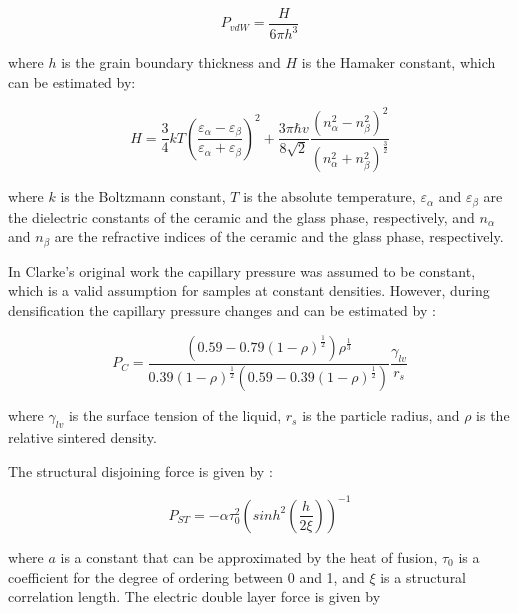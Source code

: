 \begin{equation}
\label{Ch4-eq: eq4}
P_{vdW} = \frac{H}{6 \pi h^{3}}
\end{equation}

\noindent where $h$ is the grain boundary thickness and $H$ is the Hamaker constant, which can be estimated by:

\begin{equation}
\label{Ch4-eq: eq5}
H = \frac{3}{4}kT\left( \frac{\varepsilon_{\alpha} - \varepsilon_{\beta}}{\varepsilon_{\alpha} + \varepsilon_{\beta}} \right)^{2} + \frac{3 \pi \hbar v}{8 \sqrt{2}} \frac{\left( n_{\alpha}^{2} - n_{\beta}^{2} \right)^{2}}{\left( n_{\alpha}^{2} + n_{\beta}^{2} \right)^{\frac{3}{2}}}
\end{equation}

\noindent where $k$ is the Boltzmann constant, $T$ is the absolute temperature, $\varepsilon_{\alpha}$ and $\varepsilon_{\beta}$ are the dielectric constants of the ceramic and the glass phase, respectively, and $n_{\alpha}$ and $n_{\beta}$ are the refractive indices of the ceramic and the glass phase, respectively.

In Clarke's original work the capillary pressure was assumed to be constant, which is a valid assumption for samples at constant densities. However, during densification the capillary pressure changes and can be estimated by \cite{Kwon1991}:

\begin{equation}
\label{Ch4-eq: eq6}
P_{C} = \frac{\left( 0.59-0.79 \left(1-\rho \right)^{\frac{1}{2}} \right) \rho^{\frac{1}{3}}}{0.39 \left(1-\rho \right)^{\frac{1}{2}} \left(0.59-0.39 \left(1-\rho \right)^{\frac{1}{2}} \right)} \frac{\gamma_{lv}}{r_{s}}
\end{equation}

\noindent where $\gamma_{lv}$ is the surface tension of the liquid, $r_{s}$ is the particle radius, and $\rho$ is the relative sintered density.

The structural disjoining force is given by \cite{Clarke1987}:

\begin{equation}
\label{Ch4-eq: eq7}
P_{ST} = - \alpha \tau_{0}^{2} \left( sinh^{2} \left( \frac{h}{2 \xi} \right) \right)^{-1}
\end{equation}

\noindent where $a$ is a constant that can be approximated by the heat of fusion, $\tau_{0}$ is a coefficient for the degree of ordering between 0 and 1, and $\xi$ is a structural correlation length.
The electric double layer force is given by \cite{Clarke1993}

